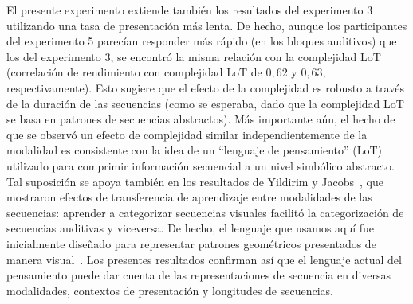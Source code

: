 
El presente experimento extiende también los resultados del experimento 3 utilizando una tasa de presentación más lenta. De hecho, aunque los participantes del experimento 5 parecían responder más rápido (en los bloques auditivos) que los del experimento 3, se encontró la misma relación con la complejidad LoT (correlación de rendimiento con complejidad LoT de $0,62$ y $0,63$, respectivamente). Esto sugiere que el efecto de la complejidad es robusto a través de la duración de las secuencias (como se esperaba, dado que la complejidad LoT se basa en patrones de secuencias abstractos). Más importante aún, el hecho de que se observó un efecto de complejidad similar independientemente de la modalidad es consistente con la idea de un ``lenguaje de pensamiento'' (LoT) utilizado para comprimir información secuencial a un nivel simbólico abstracto. Tal suposición se apoya también en los resultados de Yildirim y Jacobs~\cite{yildirim2015learning}, que mostraron efectos de transferencia de aprendizaje entre modalidades de las secuencias: aprender a categorizar secuencias visuales facilitó la categorización de secuencias auditivas y viceversa. De hecho, el lenguaje que usamos aquí fue inicialmente diseñado para representar patrones geométricos presentados de manera visual~\cite{amalric2017language}. Los presentes resultados confirman así que el lenguaje actual del pensamiento puede dar cuenta de las representaciones de secuencia en diversas modalidades, contextos de presentación y longitudes de secuencias.

